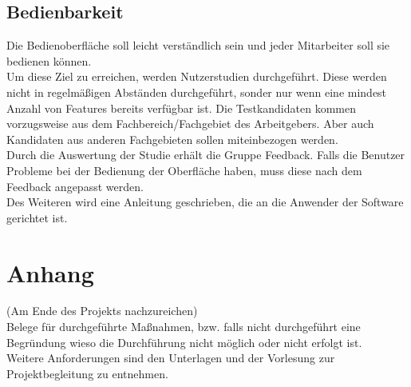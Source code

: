 \documentclass[accentcolor=tud9c,12pt,paper=a4]{tudreport}
\begin{document}
		\section{Bedienbarkeit}
		Die Bedienoberfläche soll leicht verständlich sein und jeder
		Mitarbeiter soll sie bedienen können.
			\\[5pt]
			Um diese Ziel zu erreichen, werden Nutzerstudien durchgeführt.
			Diese werden nicht in regelmäßigen Abständen durchgeführt,
			sonder nur wenn eine mindest Anzahl von Features bereits
			verfügbar ist. Die Testkandidaten kommen vorzugsweise aus dem
			Fachbereich/Fachgebiet des Arbeitgebers. Aber auch Kandidaten aus anderen
			Fachgebieten sollen miteinbezogen werden.
			\\[5pt]
			Durch die Auswertung der Studie erhält die Gruppe Feedback.
			Falls die Benutzer Probleme bei der Bedienung der Oberfläche haben, muss 
			diese nach dem Feedback angepasst werden.
			\\[5pt]
			Des Weiteren wird eine Anleitung geschrieben, die an die Anwender der Software
			gerichtet ist.

\appendix
	\chapter{Anhang}
		(Am Ende des Projekts nachzureichen)\\
		Belege für durchgeführte Maßnahmen, bzw. falls nicht durchgeführt eine Begründung wieso die Durchführung nicht möglich oder nicht erfolgt ist. \\
		Weitere Anforderungen sind den Unterlagen und der Vorlesung zur Projektbegleitung zu entnehmen.
\end{document}
